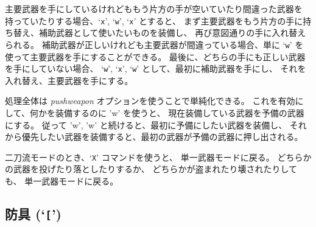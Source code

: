 主要武器を手にしているけれどももう片方の手が空いていたり間違った武器を
持っていたりする場合、`{\tt x}', `{\tt w}', `{\tt x}' とすると、
まず主要武器をもう片方の手に持ち替え、補助武器として使いたいものを装備し、
再び意図通りの手に入れ替えられる。
補助武器が正しいけれども主要武器が間違っている場合、単に
`{\tt w}' を使って主要武器を手にすることができる。
最後に、どちらの手にも正しい武器を手にしていない場合、
`{\tt w}', `{\tt x}', `{\tt w}' として、最初に補助武器を手にし、
それを入れ替え、主要武器を手にする。

処理全体は
{\it pushweapon\/}
オプションを使うことで単純化できる。
これを有効にして、何かを装備するのに 'w' を使うと、
現在装備している武器を予備の武器にする。
従って 'w', 'w' と続けると、最初に予備にしたい武器を装備し、
それから優先したい武器を装備すると、最初の武器が予備の武器に押し出される。

二刀流モードのとき、`{\tt X}' コマンドを使うと、
単一武器モードに戻る。
どちらかの武器を投げたり落としたりするか、
どちらかが盗まれたり壊されたりしても、
単一武器モードに戻る。

\subsection*{防具 (`{\tt [}')}

